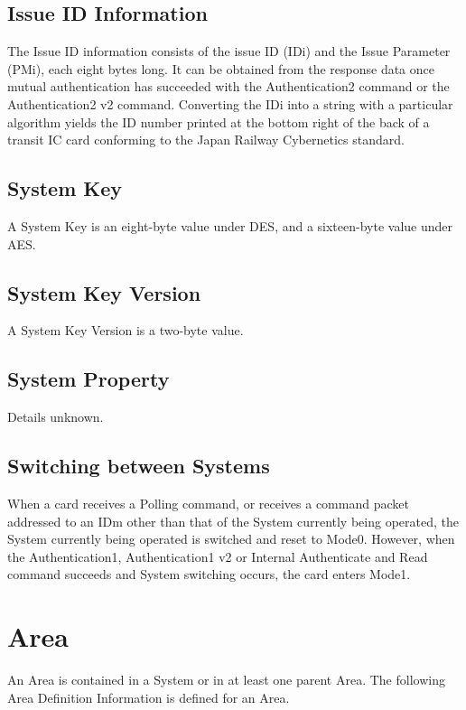 \documentclass[a4paper,11pt]{report}
\begin{document}
\subsection{Issue ID Information}

The Issue ID information consists of the issue ID (IDi) and the Issue Parameter (PMi), each eight bytes long. It can be obtained from the response data once mutual authentication has succeeded with the Authentication2 command or the Authentication2 v2 command. Converting the IDi into a string with a particular algorithm yields the ID number printed at the bottom right of the back of a transit IC card conforming to the Japan Railway Cybernetics standard.

\subsection{System Key}

A System Key is an eight-byte value under DES, and a sixteen-byte value under AES.

\subsection{System Key Version}

A System Key Version is a two-byte value.

\subsection{System Property}

Details unknown.

\subsection{Switching between Systems}

When a card receives a Polling command, or receives a command packet addressed to an IDm other than that of the System currently being operated, the System currently being operated is switched and reset to Mode0. However, when the Authentication1, Authentication1 v2 or Internal Authenticate and Read command succeeds and System switching occurs, the card enters Mode1.

\section{Area}

An Area is contained in a System or in at least one parent Area. The following Area Definition Information is defined for an Area.
\end{document}
